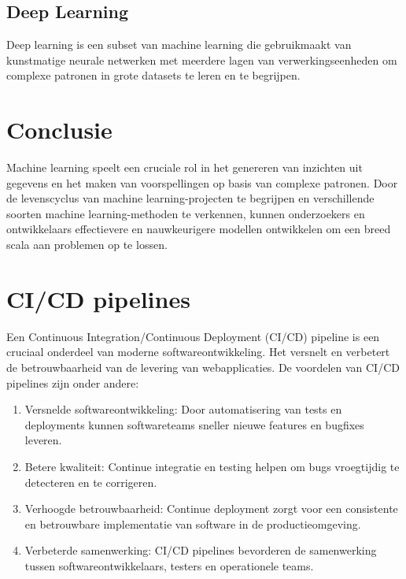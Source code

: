 \subsection{Deep Learning}
Deep learning is een subset van machine learning die gebruikmaakt van kunstmatige neurale netwerken met meerdere lagen van verwerkingseenheden om complexe patronen in grote datasets te leren en te begrijpen.

\section{Conclusie}

Machine learning speelt een cruciale rol in het genereren van inzichten uit gegevens en het maken van voorspellingen op basis van complexe patronen. Door de levenscyclus van machine learning-projecten te begrijpen en verschillende soorten machine learning-methoden te verkennen, kunnen onderzoekers en ontwikkelaars effectievere en nauwkeurigere modellen ontwikkelen om een breed scala aan problemen op te lossen.
\section{CI/CD pipelines}

Een Continuous Integration/Continuous Deployment (CI/CD) pipeline is een cruciaal onderdeel van moderne softwareontwikkeling. Het versnelt en verbetert de betrouwbaarheid van de levering van webapplicaties. De voordelen van CI/CD pipelines zijn onder andere:

\begin{enumerate}[label=\arabic*.]
    \item Versnelde softwareontwikkeling: Door automatisering van tests en deployments kunnen softwareteams sneller nieuwe features en bugfixes leveren.
    \item Betere kwaliteit: Continue integratie en testing helpen om bugs vroegtijdig te detecteren en te corrigeren.
    \item Verhoogde betrouwbaarheid: Continue deployment zorgt voor een consistente en betrouwbare implementatie van software in de productieomgeving.
    \item Verbeterde samenwerking: CI/CD pipelines bevorderen de samenwerking tussen softwareontwikkelaars, testers en operationele teams.
\end{enumerate}

